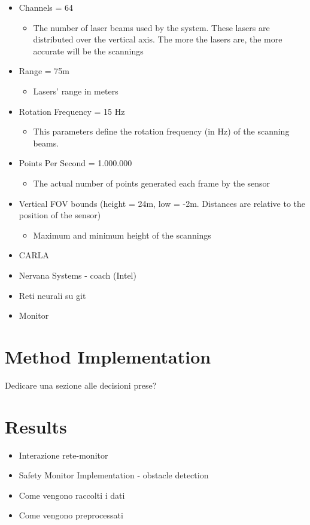 \begin{itemize}
	\item Channels = 64
	\begin{itemize}
		\item The number of laser beams used by the system. These lasers are distributed over the vertical axis. The more the lasers are, the more accurate will be the scannings
	\end{itemize}
	\item Range = 75m
	\begin{itemize}
		\item Lasers' range in meters
	\end{itemize}
	\item Rotation Frequency = 15 Hz
	\begin{itemize}
		\item This parameters define the rotation frequency (in Hz) of the scanning beams.
	\end{itemize}
	\item Points Per Second = 1.000.000
	\begin{itemize}
		\item The actual number of points generated each frame by the sensor
	\end{itemize}
	\item Vertical FOV bounds (height = 24m, low = -2m. Distances are relative to the position of the sensor)
	\begin{itemize}
		\item Maximum and minimum height of the scannings
	\end{itemize}
\end{itemize}

\begin{itemize}
	\item CARLA
	\item Nervana Systems - coach (Intel)
	\item Reti neurali su git
	\item Monitor
\end{itemize}


\section{Method Implementation}

Dedicare una sezione alle decisioni prese?

\section{Results}

\begin{itemize}
	
	\item Interazione rete-monitor
	\item Safety Monitor Implementation - obstacle detection
	\item Come vengono raccolti i dati
	\item Come vengono preprocessati
	
\end{itemize}

